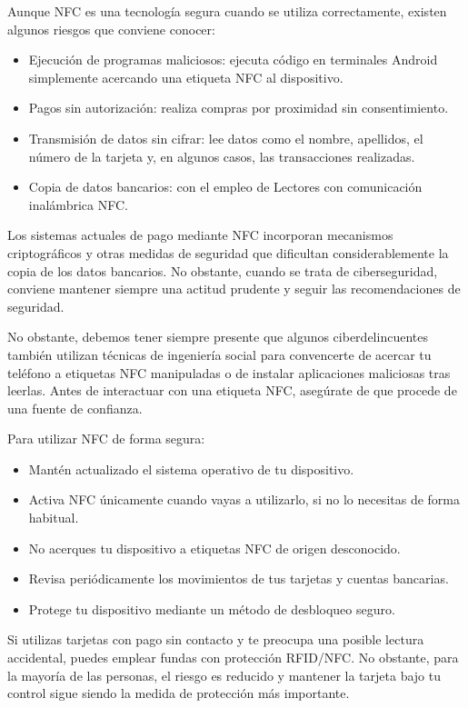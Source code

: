 \documentclass[
  spanish,
  a4paper,
  openany]{book}
\begin{document}
Aunque NFC es una tecnología segura cuando se utiliza correctamente, existen algunos riesgos que conviene conocer:

\begin{itemize}
\item
  Ejecución de programas maliciosos: ejecuta código en terminales Android simplemente acercando una etiqueta NFC al dispositivo.
\item
  Pagos sin autorización: realiza compras por proximidad sin consentimiento.
\item
  Transmisión de datos sin cifrar: lee datos como el nombre, apellidos, el número de la tarjeta y, en algunos casos, las transacciones realizadas.
\item
  Copia de datos bancarios: con el empleo de Lectores con comunicación inalámbrica NFC.
\end{itemize}

Los sistemas actuales de pago mediante NFC incorporan mecanismos criptográficos y otras medidas de seguridad que dificultan considerablemente la copia de los datos bancarios. No obstante, cuando se trata de ciberseguridad, conviene mantener siempre una actitud prudente y seguir las recomendaciones de seguridad.

No obstante, debemos tener siempre presente que algunos ciberdelincuentes también utilizan técnicas de ingeniería social para convencerte de acercar tu teléfono a etiquetas NFC manipuladas o de instalar aplicaciones maliciosas tras leerlas. Antes de interactuar con una etiqueta NFC, asegúrate de que procede de una fuente de confianza.

Para utilizar NFC de forma segura:

\begin{itemize}
\item
  Mantén actualizado el sistema operativo de tu dispositivo.
\item
  Activa NFC únicamente cuando vayas a utilizarlo, si no lo necesitas de forma habitual.
\item
  No acerques tu dispositivo a etiquetas NFC de origen desconocido.
\item
  Revisa periódicamente los movimientos de tus tarjetas y cuentas bancarias.
\item
  Protege tu dispositivo mediante un método de desbloqueo seguro.
\end{itemize}

Si utilizas tarjetas con pago sin contacto y te preocupa una posible lectura accidental, puedes emplear fundas con protección RFID/NFC. No obstante, para la mayoría de las personas, el riesgo es reducido y mantener la tarjeta bajo tu control sigue siendo la medida de protección más importante.
\end{document}
